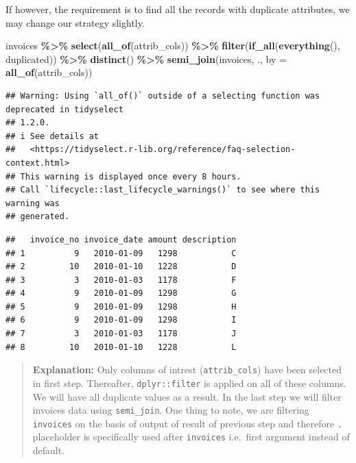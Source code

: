 \documentclass[
]{book}
\newenvironment{Shaded}{\begin{snugshade}}{\end{snugshade}}
\newcommand{\AttributeTok}[1]{\textcolor[rgb]{0.13,0.29,0.53}{#1}}
\newcommand{\FunctionTok}[1]{\textcolor[rgb]{0.13,0.29,0.53}{\textbf{#1}}}
\newcommand{\NormalTok}[1]{#1}
\newcommand{\SpecialCharTok}[1]{\textcolor[rgb]{0.81,0.36,0.00}{\textbf{#1}}}
\begin{document}
If however, the requirement is to find all the records with duplicate attributes, we may change our strategy slightly.

\begin{Shaded}
\begin{Highlighting}[]
\NormalTok{invoices }\SpecialCharTok{\%\textgreater{}\%} 
  \FunctionTok{select}\NormalTok{(}\FunctionTok{all\_of}\NormalTok{(attrib\_cols)) }\SpecialCharTok{\%\textgreater{}\%} 
  \FunctionTok{filter}\NormalTok{(}\FunctionTok{if\_all}\NormalTok{(}\FunctionTok{everything}\NormalTok{(), duplicated)) }\SpecialCharTok{\%\textgreater{}\%} 
  \FunctionTok{distinct}\NormalTok{() }\SpecialCharTok{\%\textgreater{}\%} 
  \FunctionTok{semi\_join}\NormalTok{(invoices, ., }\AttributeTok{by =} \FunctionTok{all\_of}\NormalTok{(attrib\_cols)) }
\end{Highlighting}
\end{Shaded}

\begin{verbatim}
## Warning: Using `all_of()` outside of a selecting function was deprecated in tidyselect
## 1.2.0.
## i See details at
##   <https://tidyselect.r-lib.org/reference/faq-selection-context.html>
## This warning is displayed once every 8 hours.
## Call `lifecycle::last_lifecycle_warnings()` to see where this warning was
## generated.
\end{verbatim}

\begin{verbatim}
##   invoice_no invoice_date amount description
## 1          9   2010-01-09   1298           C
## 2         10   2010-01-10   1228           D
## 3          3   2010-01-03   1178           F
## 4          9   2010-01-09   1298           G
## 5          9   2010-01-09   1298           H
## 6          9   2010-01-09   1298           I
## 7          3   2010-01-03   1178           J
## 8         10   2010-01-10   1228           L
\end{verbatim}

\begin{quote}
\textbf{Explanation:} Only columns of intrest (\texttt{attrib\_cols}) have been selected in first step. Thereafter, \texttt{dplyr::filter} is applied on all of these columns. We will have all duplicate values as a result. In the last step we will filter invoices data using \texttt{semi\_join}. One thing to note, we are filtering \texttt{invoices} on the basis of output of result of previous step and therefore \texttt{.} placeholder is specifically used after \texttt{invoices} i.e.~first argument instead of default.
\end{quote}
\end{document}
